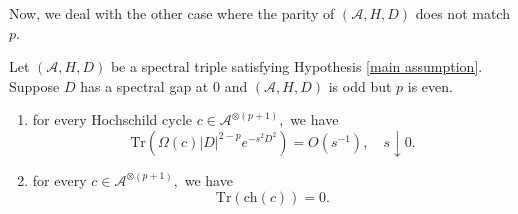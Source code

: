     Now, we deal with the other case where the parity of $(\mathcal{A},H,D)$ does not match $p$.
    \begin{lem}\label{second opposite lemma} 
        Let $(\mathcal{A},H,D)$ be a spectral triple satisfying Hypothesis \ref{main assumption}. Suppose $D$ has a spectral gap at $0$ and $(\mathcal{A},H,D)$ is odd but $p$ is even.
        \begin{enumerate}[{\rm (i)}]
            \item\label{second opposite 1} for every Hochschild cycle $c\in\mathcal{A}^{\otimes (p+1)},$ we have
                \begin{equation*}
                    \mathrm{Tr}(\Omega(c)|D|^{2-p}e^{-s^2D^2}) = O(s^{-1}),\quad s\downarrow0.
                \end{equation*}
            \item\label{second opposite 2} for every $c\in\mathcal{A}^{\otimes (p+1)},$ we have
                \begin{equation*}
                    \mathrm{Tr}(\mathrm{ch}(c))=0.
                \end{equation*}
        \end{enumerate}
    \end{lem}    
